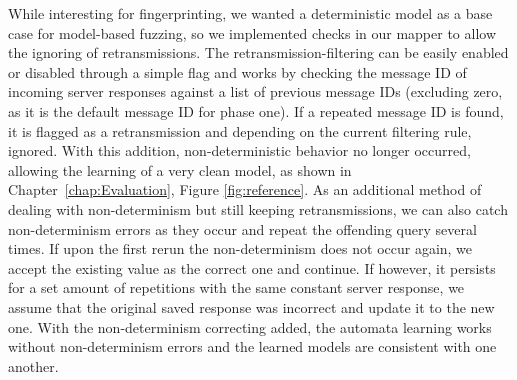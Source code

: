 While interesting for fingerprinting, we wanted a deterministic model as a base case for model-based fuzzing, so we implemented checks in our mapper to allow the ignoring of retransmissions. The retransmission-filtering can be easily enabled or disabled through a simple flag and works by checking the message ID of incoming server responses against a list of previous message IDs (excluding zero, as it is the default message ID for phase one). If a repeated message ID is found, it is flagged as a retransmission and depending on the current filtering rule, ignored. With this addition, non-deterministic behavior no longer occurred, allowing the learning of a very clean model, as shown in Chapter~\ref{chap:Evaluation}, Figure \ref{fig:reference}. As an additional method of dealing with non-determinism but still keeping retransmissions, we can also catch non-determinism errors as they occur and repeat the offending query several times. If upon the first rerun the non-determinism does not occur again, we accept the existing value as the correct one and continue. If however, it persists for a set amount of repetitions with the same constant server response, we assume that the original saved response was incorrect and update it to the new one. With the non-determinism correcting added, the automata learning works without non-determinism errors and the learned models are consistent with one another.
